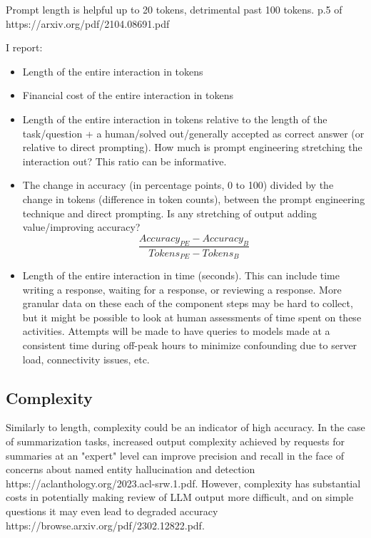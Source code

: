 \documentclass[11pt]{article}
\begin{document}
Prompt length is helpful up to 20 tokens, detrimental past 100 tokens. p.5 of https://arxiv.org/pdf/2104.08691.pdf

I report:

\begin{itemize}
  \item Length of the entire interaction in tokens
  \item Financial cost of the entire interaction in tokens
  \item Length of the entire interaction in tokens relative to the length of the task/question + a human/solved out/generally accepted as correct answer (or relative to direct prompting). How much is prompt engineering stretching the interaction out? This ratio can be informative.
  \item The change in accuracy (in percentage points, 0 to 100) divided by the change in tokens (difference in token counts), between the prompt engineering technique and direct prompting. Is any stretching of output adding value/improving accuracy? %
  \begin{displaymath}
    \frac{Accuracy_{PE} - Accuracy_{B}}{Tokens_{PE} - Tokens_{B}}
  \end{displaymath}
  \item Length of the entire interaction in time (seconds). This can include time writing a response, waiting for a response, or reviewing a response. More granular data on these each of the component steps may be hard to collect, but it might be possible to look at human assessments of time spent on these activities. Attempts will be made to have queries to models made at a consistent time during off-peak hours to minimize confounding due to server load, connectivity issues, etc.
\end{itemize}

\subsection*{Complexity}

Similarly to length, complexity could be an indicator of high accuracy. In the case of summarization tasks, increased output complexity achieved by requests for summaries at an "expert" level can improve precision and recall in the face of concerns about named entity hallucination and detection https://aclanthology.org/2023.acl-srw.1.pdf. However, complexity has substantial costs in potentially making review of LLM output more difficult, and on simple questions it may even lead to degraded accuracy https://browse.arxiv.org/pdf/2302.12822.pdf. 
\end{document}
